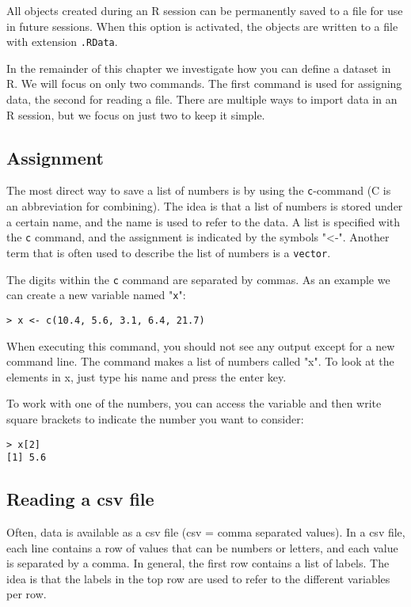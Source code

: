 All objects created during an R session can be permanently saved to a file for use in future sessions. When this option is activated, the objects are written to a file with extension \texttt{.RData}.

In the remainder of this chapter we investigate how you can define a dataset in R. We will focus on only two commands. The first command is used for assigning data, the second for reading a file. There are multiple ways to import data in an R session, but we focus on just two to keep it simple.


\subsection{Assignment}

The most direct way to save a list of numbers is by using the  \texttt{c}-command (C is an abbreviation for combining).
The idea is that a list of numbers is stored under a certain name, and the name is used to refer to the data.
A list is specified with the \texttt{c} command, and the assignment is indicated by the symbols "<-".
Another term that is often used to describe the list of numbers is a \texttt{vector}.

The digits within the \texttt{c} command are separated by commas. As an example we can create a new variable named "\texttt{x}":
\begin{lstlisting}
> x <- c(10.4, 5.6, 3.1, 6.4, 21.7)
\end{lstlisting}

When executing this command, you should not see any output except for a new command line. The command makes a list of numbers called "x". To look at the elements in x, just type his name and press the enter key.

To work with one of the numbers, you can access the variable and then write square brackets to indicate the number you want to consider:
\begin{lstlisting}
> x[2]
[1] 5.6
\end{lstlisting}

\subsection{Reading a csv file}

Often, data is available as a csv file (csv = comma separated values).
In a csv file, each line contains a row of values that can be numbers or letters, and each value is separated by a comma. 
In general, the first row contains a list of labels. 
The idea is that the labels in the top row are used to refer to the different variables per row.

